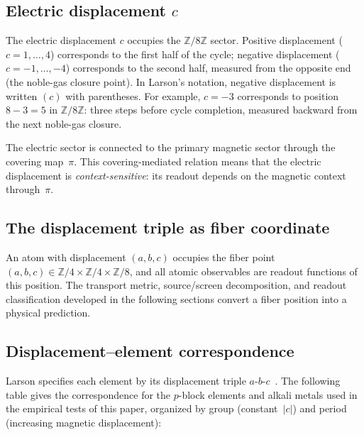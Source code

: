 \documentclass[11pt,a4paper]{article}
\begin{document}
\subsection{Electric displacement $c$}

The electric displacement $c$ occupies the $\mathbb{Z}/8\mathbb{Z}$ sector. Positive displacement ($c = 1, \ldots, 4$) corresponds to the first half of the cycle; negative displacement ($c = -1, \ldots, -4$) corresponds to the second half, measured from the opposite end (the noble-gas closure point). In Larson's notation, negative displacement is written $(c)$ with parentheses. For example, $c = -3$ corresponds to position $8 - 3 = 5$ in $\mathbb{Z}/8\mathbb{Z}$: three steps before cycle completion, measured backward from the next noble-gas closure.

The electric sector is connected to the primary magnetic sector through the covering map~$\pi$. This covering-mediated relation means that the electric displacement is \emph{context-sensitive}: its readout depends on the magnetic context through~$\pi$.

\subsection{The displacement triple as fiber coordinate}

An atom with displacement $(a, b, c)$ occupies the fiber point $(a, b, c) \in \mathbb{Z}/4 \times \mathbb{Z}/4 \times \mathbb{Z}/8$, and all atomic observables are readout functions of this position. The transport metric, source/screen decomposition, and readout classification developed in the following sections convert a fiber position into a physical prediction.

\subsection{Displacement--element correspondence}
\label{sec:displacement-element}

Larson specifies each element by its displacement triple $a$-$b$-$c$~\cite{Larson1979,Larson1988}. The following table gives the correspondence for the $p$-block elements and alkali metals used in the empirical tests of this paper, organized by group (constant~$|c|$) and period (increasing magnetic displacement):
\end{document}
